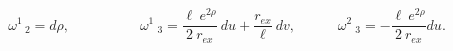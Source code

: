 \begin{equation}
\omega ^{1}\,_{2}=d\rho,\,\,\,\,\,\,\,\,\,\,\,\,\,\,\,\,\,\,\,\,\,\,\,\,\,\,\,\,\,\,\omega ^{1}~_{3}=\frac{\ell~e^{
2\rho}}{2~r_{ex}}~du
+
\frac{r_{
ex}}{\ell}~dv,\,\,\,\,\,\,\,\,\,\,\,\,\,\,\,\,\,\,\omega ^{2}~_{3}=-\frac{\ell~e^{2\rho }}{2~r_{ex}}du.
\label{16}
\end{equation}

